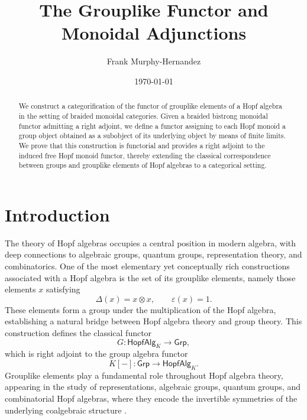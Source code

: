 \documentclass{amsart}
\newcommand{\Grp}{\mathsf{Grp}}
\newcommand{\HopfAlg}{\mathsf{HopfAlg}}
\begin{document}
\title{The Grouplike Functor and Monoidal Adjunctions}

\author{Frank Murphy-Hernandez}
\address{Facultad de Ciencias, UNAM, Mexico City}


\date{\today}

\begin{abstract}
We construct a categorification of the functor of grouplike elements of a Hopf algebra in the setting of braided monoidal categories. Given a braided bistrong monoidal functor admitting a right adjoint, we define a functor assigning to each Hopf monoid a group object obtained as a subobject of its underlying object by means of finite limits. We prove that this construction is functorial and provides a right adjoint to the induced free Hopf monoid functor, thereby extending the classical correspondence between groups and grouplike elements of Hopf algebras to a categorical setting.
\end{abstract}

\maketitle

\section*{Introduction}

The theory of Hopf algebras occupies a central position in modern algebra, with deep connections to algebraic groups, quantum groups, representation theory, and combinatorics. One of the most elementary yet conceptually rich constructions associated with a Hopf algebra is the set of its grouplike elements, namely those elements $x$ satisfying
\[
\Delta(x)=x\otimes x,\qquad \varepsilon(x)=1.
\]
These elements form a group under the multiplication of the Hopf algebra, establishing a natural bridge between Hopf algebra theory and group theory. This construction defines the classical functor
\[
G:\HopfAlg_K\longrightarrow\Grp,
\]
which is right adjoint to the group algebra functor
\[
K[-]:\Grp\longrightarrow\HopfAlg_K.
\]
Grouplike elements play a fundamental role throughout Hopf algebra theory, appearing in the study of representations, algebraic groups, quantum groups, and combinatorial Hopf algebras, where they encode the invertible symmetries of the underlying coalgebraic structure \cite{Sweedler,Montgomery,Abe}.
\end{document}

